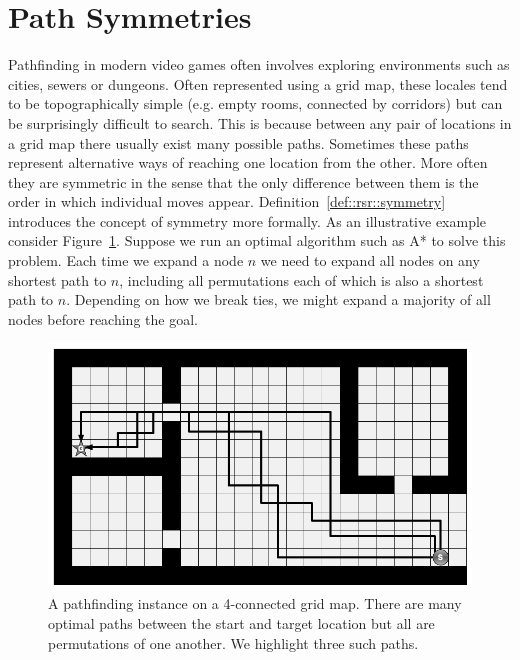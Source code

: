 
\section{Path Symmetries}
Pathfinding in modern video games often involves exploring environments such
as cities, sewers or dungeons. Often represented using a grid map, these
locales tend to be topographically simple (e.g. empty rooms, connected by
corridors) but can be surprisingly difficult to search.  This is because
between any pair of locations in a grid map there usually exist many possible
paths. Sometimes these paths represent alternative ways of reaching one
location from the other. More often they are symmetric in the sense that the
only difference between them is the order in which individual moves appear.
Definition~\ref{def::rsr::symmetry} introduces the concept of symmetry more
formally.  As an illustrative example consider
Figure~\ref{fig::rsr::symmetry}.  Suppose we run an optimal algorithm such as
A* to solve this problem.  Each time we expand a node $n$ we need to expand
all nodes on any shortest path to $n$, including all permutations each of which
is also a shortest path to $n$. Depending on how we break ties, we
might expand a majority of all nodes before reaching the goal.

\begin{figure}[tb]
\begin{center}
\includegraphics[scale=0.30, trim = 10mm 10mm 10mm 0mm]{chapter_rsr/diagrams/symmetry.png}
\end{center}
\vspace{-3pt}
\caption[An example of path symmetry]{
\small
A pathfinding instance on a 4-connected grid map. There are many optimal
paths between the start and target location but all are permutations of 
one another. We highlight three such paths.}

\label{fig::rsr::symmetry}
\end{figure}

